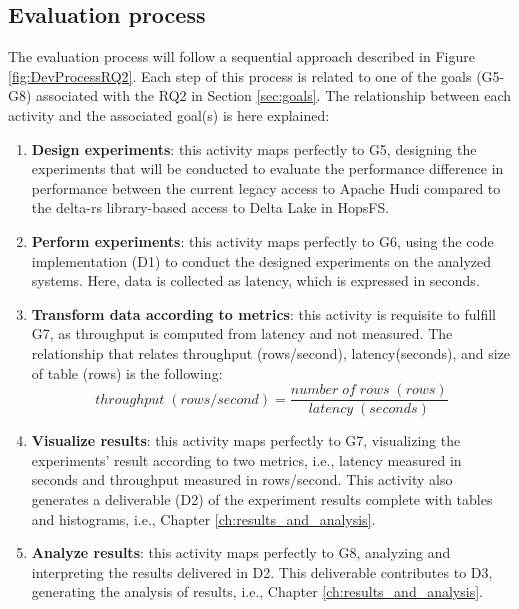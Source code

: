 \subsection{Evaluation process}
\label{subsec:eval_process}
The evaluation process will follow a sequential approach described in Figure \ref{fig:DevProcessRQ2}. Each step of this process is related to one of the goals (G5-G8) associated with the RQ2 in Section \ref{sec:goals}.
The relationship between each activity and the associated goal(s) is here explained:
\begin{enumerate}
    \item \textbf{Design experiments}: this activity maps perfectly to G5, designing the experiments that will be conducted to evaluate the performance difference in performance between the current legacy access to Apache Hudi compared to the delta-rs library-based access to Delta Lake in \gls{HopsFS}. 
    \item \textbf{Perform experiments}: this activity maps perfectly to G6, using the code implementation (D1) to conduct the designed experiments on the analyzed systems. Here, data is collected as latency, which is expressed in seconds.
    \item \textbf{Transform data according to metrics}: this activity is requisite to fulfill G7, as throughput is computed from latency and not measured. The relationship that relates throughput (rows/second), latency(seconds), and size of table (rows) is the following:
    \[ throughput \; (rows/second) = \frac{number \; of \; rows \; (rows)}{latency \;(seconds)}\]
    \item \textbf{Visualize results}: this activity maps perfectly to G7, visualizing the experiments' result according to two metrics, i.e., latency measured in seconds and throughput measured in rows/second. This activity also generates a deliverable (D2) of the experiment results complete with tables and histograms, i.e., Chapter \ref{ch:results_and_analysis}.
    \item \textbf{Analyze results}: this activity maps perfectly to G8, analyzing and interpreting the results delivered in D2. This deliverable contributes to D3, generating the analysis of results, i.e., Chapter \ref{ch:results_and_analysis}.
\end{enumerate}
